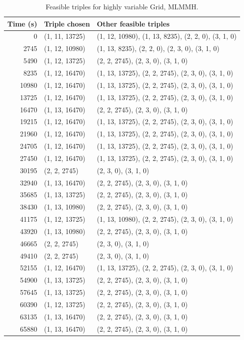 \documentclass[../main.tex]{subfiles}
\begin{document}
\begin{table}[H]
\caption{Feasible triples for highly variable Grid, MLMMH.} \label{tbl1}
\begin{tabularx}{6.5 in}{r l X}
\hline {{Time (s)}} & {{Triple chosen}} & {{Other feasible triples}} \\ \hline
0 & (1, 11, 13725) & (1, 12, 10980), (1, 13, 8235), (2, 2, 0), (3, 1, 0) \\
2745 & (1, 12, 10980) & (1, 13, 8235), (2, 2, 0), (2, 3, 0), (3, 1, 0) \\
5490 & (1, 12, 13725) & (2, 2, 2745), (2, 3, 0), (3, 1, 0) \\
8235 & (1, 12, 16470) & (1, 13, 13725), (2, 2, 2745), (2, 3, 0), (3, 1, 0) \\
10980 & (1, 12, 16470) & (1, 13, 13725), (2, 2, 2745), (2, 3, 0), (3, 1, 0) \\
13725 & (1, 12, 16470) & (1, 13, 13725), (2, 2, 2745), (2, 3, 0), (3, 1, 0) \\
16470 & (1, 13, 16470) & (2, 2, 2745), (2, 3, 0), (3, 1, 0) \\
19215 & (1, 12, 16470) & (1, 13, 13725), (2, 2, 2745), (2, 3, 0), (3, 1, 0) \\
21960 & (1, 12, 16470) & (1, 13, 13725), (2, 2, 2745), (2, 3, 0), (3, 1, 0) \\
24705 & (1, 12, 16470) & (1, 13, 13725), (2, 2, 2745), (2, 3, 0), (3, 1, 0) \\
27450 & (1, 12, 16470) & (1, 13, 13725), (2, 2, 2745), (2, 3, 0), (3, 1, 0) \\
30195 & (2, 2, 2745) & (2, 3, 0), (3, 1, 0) \\
32940 & (1, 13, 16470) & (2, 2, 2745), (2, 3, 0), (3, 1, 0) \\
35685 & (1, 13, 13725) & (2, 2, 2745), (2, 3, 0), (3, 1, 0) \\
38430 & (1, 13, 10980) & (2, 2, 2745), (2, 3, 0), (3, 1, 0) \\
41175 & (1, 12, 13725) & (1, 13, 10980), (2, 2, 2745), (2, 3, 0), (3, 1, 0) \\
43920 & (1, 13, 10980) & (2, 2, 2745), (2, 3, 0), (3, 1, 0) \\
46665 & (2, 2, 2745) & (2, 3, 0), (3, 1, 0) \\
49410 & (2, 2, 2745) & (2, 3, 0), (3, 1, 0) \\
52155 & (1, 12, 16470) & (1, 13, 13725), (2, 2, 2745), (2, 3, 0), (3, 1, 0) \\
54900 & (1, 13, 13725) & (2, 2, 2745), (2, 3, 0), (3, 1, 0) \\
57645 & (1, 13, 13725) & (2, 2, 2745), (2, 3, 0), (3, 1, 0) \\
60390 & (1, 12, 13725) & (2, 2, 2745), (2, 3, 0), (3, 1, 0) \\
63135 & (1, 13, 16470) & (2, 2, 2745), (2, 3, 0), (3, 1, 0) \\
65880 & (1, 13, 16470) & (2, 2, 2745), (2, 3, 0), (3, 1, 0) \\


\hline
\end{tabularx}
\end{table}
\clearpage
\end{document}
